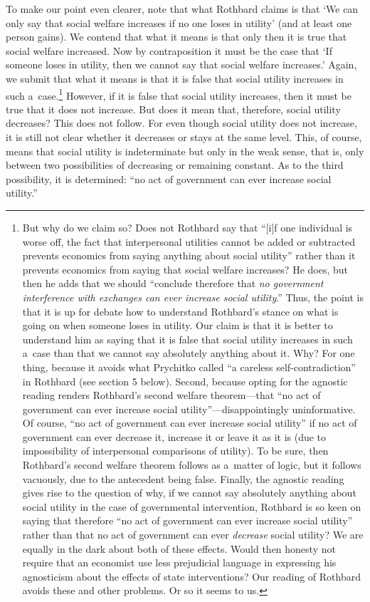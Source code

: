 To make our point even clearer, note that what Rothbard claims is that ‘We can only say that social welfare increases if no one loses in utility' (and at least one person gains). We contend that what it means is that only then it is true that social welfare increased. Now by contraposition it must be the case that ‘If someone loses in utility, then we cannot say that social welfare increases.' Again, we submit that what it means is that it is false that social utility increases in such a~case.\footnote{But why do we claim so? Does not Rothbard say that ``[i]f one individual is worse off, the fact that interpersonal utilities cannot be added or subtracted prevents economics from saying anything about social utility'' rather than it prevents economics from saying that social welfare increases? He does, but then he adds that we should ``conclude therefore that \textit{no government interference with exchanges can ever increase social utility}.'' Thus, the point is that it is up for debate how to understand Rothbard's stance on what is going on when someone loses in utility. Our claim is that it is better to understand him as saying that it is false that social utility increases in such a~case than that we cannot say absolutely anything about it. Why? For one thing, because it avoids what Prychitko called ``a careless self-contradiction'' in Rothbard (see section 5 below). Second, because opting for the agnostic reading renders Rothbard's second welfare theorem---that ``no act of government can ever increase social utility''---disappointingly uninformative. Of course, ``no act of government can ever increase social utility'' if no act of government can ever decrease it, increase it or leave it as it is (due to impossibility of interpersonal comparisons of utility). To be sure, then Rothbard's second welfare theorem follows as a~matter of logic, but it follows vacuously, due to the antecedent being false. Finally, the agnostic reading gives rise to the question of why, if we cannot say absolutely anything about social utility in the case of governmental intervention, Rothbard is so keen on saying that therefore ``no act of government can ever increase social utility'' rather than that no act of government can ever \textit{decrease} social utility? We are equally in the dark about both of these effects. Would then honesty not require that an economist use less prejudicial language in expressing his agnosticism about the effects of state interventions? Our reading of Rothbard avoids these and other problems. Or so it seems to us.} However, if it is false that social utility increases, then it must be true that it does not increase. But does it mean that, therefore, social utility decreases? This does not follow. For even though social utility does not increase, it is still not clear whether it decreases or stays at the same level. This, of course, means that social utility is indeterminate but only in the weak sense, that is, only between two possibilities of decreasing or remaining constant. As to the third possibility, it is determined: ``no act of government can ever increase social utility.'' 
